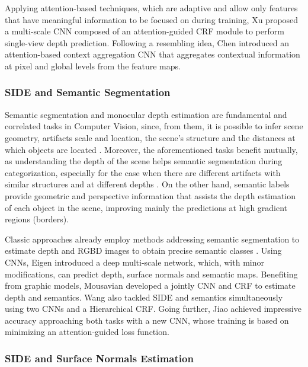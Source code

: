 \documentclass[5p]{elsarticle}
\begin{document}
Applying attention-based techniques, which are adaptive and allow only features that have meaningful information to be focused on during training, Xu \etal \cite{xu2018structured} proposed a multi-scale CNN composed of an attention-guided CRF module to perform single-view depth prediction. Following a resembling idea, Chen \etal \cite{chen2019attention} introduced an attention-based context aggregation CNN that aggregates contextual information at pixel and global levels from the feature maps. 

\subsubsection{SIDE and Semantic Segmentation}

Semantic segmentation and monocular depth estimation are fundamental and correlated tasks in Computer Vision, since, from them, it is possible to infer scene geometry, artifacts scale and location, the scene’s structure and the distances at which objects are located \cite{jiao2018look}. Moreover, the aforementioned tasks benefit mutually, as understanding the depth of the scene helps semantic segmentation during categorization, especially for the case when there are different artifacts with similar structures and at different depths \cite{wang2015towards}. On the other hand, semantic labels provide geometric and perspective information that assists the depth estimation of each object in the scene, improving mainly the predictions at high gradient regions (borders). 

Classic approaches already employ methods addressing semantic segmentation to estimate depth \cite{hoiem2011recovering, liu2010single} and RGBD images to obtain precise semantic classes \cite{silberman2012indoor, gupta2014learning}. Using CNNs, Eigen \etal \cite{eigen2015predicting} introduced a deep multi-scale network, which, with minor modifications, can predict depth, surface normals and semantic maps. Benefiting from graphic models, Mousavian \etal \cite{mousavian2016joint} developed a jointly CNN and CRF to estimate depth and semantics. Wang \etal \cite{wang2015towards} also tackled SIDE and semantics simultaneously using two CNNs and a Hierarchical CRF. Going further, Jiao \etal \cite{jiao2018look} achieved impressive accuracy approaching both tasks with a new CNN, whose training is based on minimizing an attention-guided loss function. 

\subsubsection{SIDE and Surface Normals Estimation}
\end{document}
